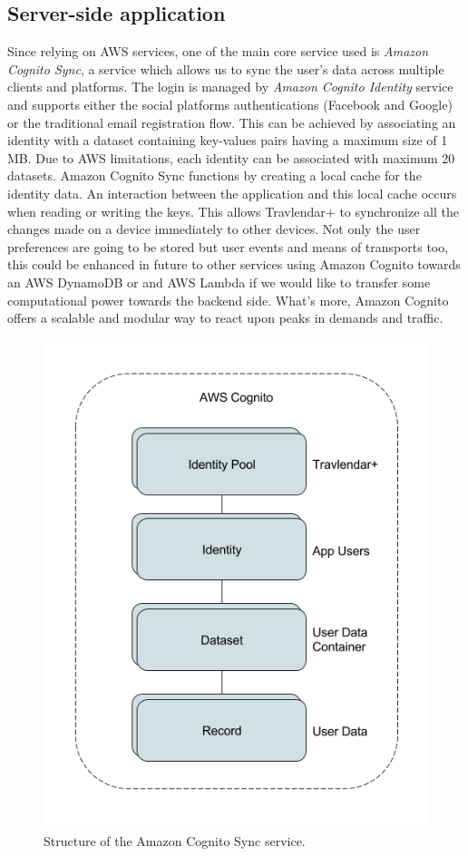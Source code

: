 \subsection*{Server-side application}
Since relying on AWS services, one of the main core service used is \textit{Amazon Cognito Sync}, a service which allows us to sync the user's data across multiple clients and platforms.
The login is managed by \textit{Amazon Cognito Identity} service and supports either the social platforms authentications (Facebook and Google) or the traditional email registration flow. This can be achieved by associating an identity with a dataset containing key-values pairs having a maximum size of 1 MB. Due to AWS limitations, each identity can be associated with maximum 20 datasets.
Amazon Cognito Sync functions by creating a local cache for the identity data. An interaction between the application and this local cache occurs when reading or writing the keys. 
This allows Travlendar+ to synchronize all the changes made on a device immediately to other devices.
Not only the user preferences are going to be stored but user events and means of transports too, this could be enhanced in future to other services using Amazon Cognito towards an AWS DynamoDB or and AWS Lambda if we would like to transfer some computational power towards the backend side. What's more, Amazon Cognito offers a scalable and modular way to react upon peaks in demands and traffic.

\begin{figure}
	\centering
	\includegraphics[width=6in]{./diagrams/CognitoDiagram.png}
	\caption{Structure of the Amazon Cognito Sync service.}
	\label{fig:seqCognito}
\end{figure}

